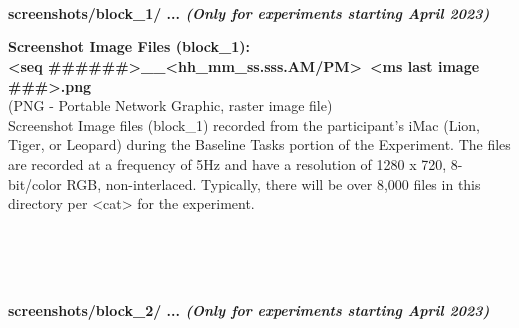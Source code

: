 \begin{description}
\begin{addmargin}[0em]{0em}
\end{addmargin} %


\textbf{\\\\\\}
\begin{addmargin}[0em]{0em} %
    \textbf{screenshots/block\_1/ ... \textit{(Only for experiments starting April 2023)}}

    \begin{addmargin}[1em]{0em} %
        \textbf{Screenshot Image Files (block\_1):\\<seq \#\#\#\#\#\#>\_<yyyy-mm-dd>\_<hh\_mm\_ss.sss.AM/PM>~<ms last image \#\#\#>.png}\\
        (PNG - Portable Network Graphic, raster image file)\\
        Screenshot Image files (block\_1) recorded from the participant's iMac (Lion, Tiger, or Leopard)
        during the Baseline Tasks portion of the Experiment.
        The files are recorded at a frequency of 5Hz and have a resolution of 1280 x 720, 8-bit/color RGB, non-interlaced.
        Typically, there will be over 8,000 files in this directory per <cat> for the experiment. 
    \end{addmargin} %

\end{addmargin} %


\textbf{\\\\\\}
\begin{addmargin}[0em]{0em} %
    \textbf{screenshots/block\_2/ ... \textit{(Only for experiments starting April 2023)}}


\end{addmargin}
\end{description}

